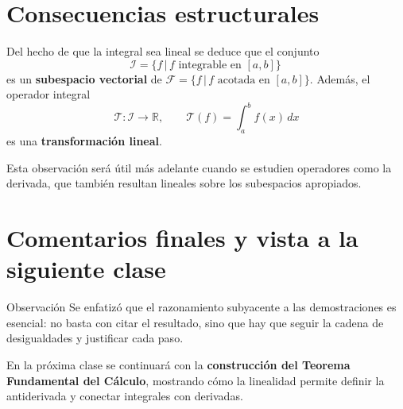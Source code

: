 \documentclass[12pt,a4paper]{article}
\begin{document}
\section{Consecuencias estructurales}
Del hecho de que la integral sea lineal se deduce que el conjunto
\[
\mathcal{I}=\{f\,|\,f\text{ integrable en }[a,b]\}\
\]
es un \textbf{subespacio vectorial} de $\mathcal{F}=\{f\,|\,f\text{ acotada en }[a,b]\}$.  Además, el operador integral
\[
\mathcal{T}:\mathcal{I}\to\mathbb{R},\qquad \mathcal{T}(f)=\int_{a}^{b} f(x)\,dx
\]
es una \textbf{transformación lineal}.

Esta observación será útil más adelante cuando se estudien operadores como la derivada, que también resultan lineales sobre los subespacios apropiados.

\section{Comentarios finales y vista a la siguiente clase}
\begin{notebox}{Observación}
Se enfatizó que el razonamiento subyacente a las demostraciones es esencial: no basta con citar el resultado, sino que hay que seguir la cadena de desigualdades y justificar cada paso.
\end{notebox}
En la próxima clase se continuará con la \textbf{construcción del Teorema Fundamental del Cálculo}, mostrando cómo la linealidad permite definir la antiderivada y conectar integrales con derivadas.
\end{document}
